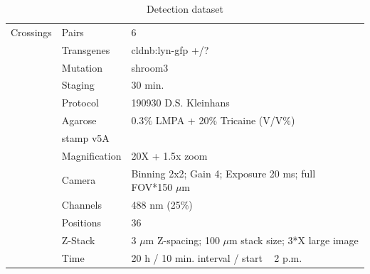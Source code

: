 \documentclass[11pt,singlespacinge,twoside]{reedthesis} %
\begin{document}
\begin{table}[!h]

\caption{\label{tab:imgdatdet}Detection dataset}
\centering
\begin{tabu} to 
\toprule
{}  Crossings & Pairs & 6\\
 & Transgenes & cldnb:lyn-gfp +/?\\

   & Mutation & shroom3\\

 & Staging & 30 min.\\

   & Protocol & 190930 D.S. Kleinhans\\

 & Agarose & 0.3$\%$ LMPA + 20$\%$ Tricaine (V/V$\%$)\\

   & stamp v5A & \\

 & Magnification & 20X + 1.5x zoom\\

   & Camera & Binning 2x2; Gain 4; Exposure 20 ms; full FOV*150 $\mu$m\\

 & Channels & 488 nm (25$\%$)\\

   & Positions & 36\\

 & Z-Stack & 3 $\mu$m Z-spacing; 100 $\mu$m stack size; 3*X large image\\

   & Time & 20 h / 10 min. interval / start ~ 2 p.m.\\
\bottomrule
\end{tabu}
\end{table}
\end{document}
